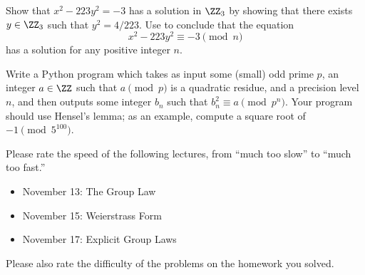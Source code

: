 \documentclass[../notes.tex]{subfiles}
\begin{document}
\begin{prob}[4 points] \label{prob:223-in-z3}
	Show that $x^2-223y^2=-3$ has a solution in $\ZZ_3$ by showing that there exists $y\in\ZZ_3$ such that $y^2=4/223$. Use  to conclude that the equation
	\[x^2-223y^2\equiv-3\pmod n\]
	has a solution for any positive integer $n$.
\end{prob}
\begin{prob}[6 points]
	Write a Python program which takes as input some (small) odd prime $p$, an integer $a\in\ZZ$ such that $a\pmod p$ is a quadratic residue, and a precision level $n$, and then outputs some integer $b_n$ such that $b_n^2\equiv a\pmod{p^n}$. Your program should use Hensel's lemma; as an example, compute a square root of $-1\pmod{5^{100}}$.
\end{prob}
\begin{prob}[0 points]
	Please rate the speed of the following lectures, from ``much too slow'' to ``much too fast.''
	\begin{itemize}
		\item November 13: The Group Law
		\item November 15: Weierstrass Form
		\item November 17: Explicit Group Laws
	\end{itemize}
	Please also rate the difficulty of the problems on the homework you solved.
\end{prob}




\end{document}
